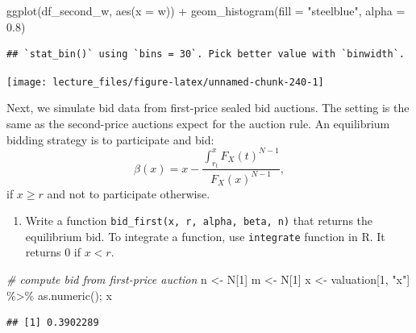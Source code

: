 \documentclass[
]{book}
\newenvironment{Shaded}{\begin{snugshade}}{\end{snugshade}}
\newcommand{\AttributeTok}[1]{\textcolor[rgb]{0.77,0.63,0.00}{#1}}
\newcommand{\CommentTok}[1]{\textcolor[rgb]{0.56,0.35,0.01}{\textit{#1}}}
\newcommand{\DecValTok}[1]{\textcolor[rgb]{0.00,0.00,0.81}{#1}}
\newcommand{\FloatTok}[1]{\textcolor[rgb]{0.00,0.00,0.81}{#1}}
\newcommand{\FunctionTok}[1]{\textcolor[rgb]{0.00,0.00,0.00}{#1}}
\newcommand{\NormalTok}[1]{#1}
\newcommand{\OtherTok}[1]{\textcolor[rgb]{0.56,0.35,0.01}{#1}}
\newcommand{\SpecialCharTok}[1]{\textcolor[rgb]{0.00,0.00,0.00}{#1}}
\newcommand{\StringTok}[1]{\textcolor[rgb]{0.31,0.60,0.02}{#1}}
\providecommand{\tightlist}{%
  \setlength{\itemsep}{0pt}\setlength{\parskip}{0pt}}
\begin{document}
\begin{Shaded}
\begin{Highlighting}[]
\FunctionTok{ggplot}\NormalTok{(df\_second\_w, }\FunctionTok{aes}\NormalTok{(}\AttributeTok{x =}\NormalTok{ w)) }\SpecialCharTok{+} \FunctionTok{geom\_histogram}\NormalTok{(}\AttributeTok{fill =} \StringTok{"steelblue"}\NormalTok{, }\AttributeTok{alpha =} \FloatTok{0.8}\NormalTok{)}
\end{Highlighting}
\end{Shaded}

\begin{verbatim}
## `stat_bin()` using `bins = 30`. Pick better value with `binwidth`.
\end{verbatim}

\begin{center}\texttt{[image: lecture\_files/figure-latex/unnamed-chunk-240-1]} \end{center}

Next, we simulate bid data from first-price sealed bid auctions. The setting is the same as the second-price auctions expect for the auction rule. An equilibrium bidding strategy is to participate and bid:
\[
\beta(x) = x - \frac{\int_{r_t}^x F_X(t)^{N - 1}}{F_X(x)^{N - 1}},
\]
if \(x \ge r\) and not to participate otherwise.

\begin{enumerate}
\def\labelenumi{\arabic{enumi}.}
\setcounter{enumi}{3}
\tightlist
\item
  Write a function \texttt{bid\_first(x,\ r,\ alpha,\ beta,\ n)} that returns the equilibrium bid. To integrate a function, use \texttt{integrate} function in R. It returns 0 if \(x < r\).
\end{enumerate}

\begin{Shaded}
\begin{Highlighting}[]
\CommentTok{\# compute bid from first{-}price auction}
\NormalTok{n }\OtherTok{\textless{}{-}}\NormalTok{ N[}\DecValTok{1}\NormalTok{]}
\NormalTok{m }\OtherTok{\textless{}{-}}\NormalTok{ N[}\DecValTok{1}\NormalTok{]}
\NormalTok{x }\OtherTok{\textless{}{-}}\NormalTok{ valuation[}\DecValTok{1}\NormalTok{, }\StringTok{"x"}\NormalTok{] }\SpecialCharTok{\%\textgreater{}\%} \FunctionTok{as.numeric}\NormalTok{(); x}
\end{Highlighting}
\end{Shaded}

\begin{verbatim}
## [1] 0.3902289
\end{verbatim}
\end{document}
